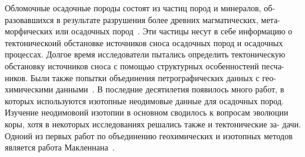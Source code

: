 \documentclass[a4paper,12pt]{article}
\begin{document}
Обломочные осадочные породы состоят из частиц пород и минералов, об- разовавшихся в результате разрушения более древних магматических, мета- морфических или осадочных пород~\parencite{art}.
Эти частицы несут в себе информацию о тектоническоий обстановке источников сноса осадочных пород и осадочных процессах. Долгое время исследователи пытались определить тектоническую обстановку источников сноса с помощью структурных особенностеий песча- ников. Были также попытки объединения петрографических данных с гео- химическими данными~\parencite{batlas}. 
В последние десятилетия появилось много работ, в которых используются изотопные неодимовые данные для осадочных пород. Изучение неодимовоий изотопии в основном сводилось к вопросам эволюции коры, хотя в некоторых исследованиях решались также и тектонические за- дачи. Одноий из первых работ по объединению геохимических и изотопных методов является работа Макленнана~\parencite{fart}.

% 


\printbibliography[sorting=nyt]
\end{document}
